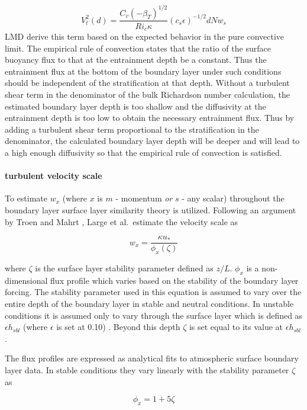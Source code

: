 \begin{equation}
  V_{t}^{2}(d)=\frac{C_v(-\beta_T)^{1/2}}{Ri_c
  \kappa}(c_s\epsilon)^{-1/2}dNw_s
\end{equation}
LMD derive this term based on the expected behavior in the pure
convective limit.  The empirical rule of convection states that the
ratio of the surface buoyancy flux to that at the entrainment depth be 
a constant.  Thus the entrainment flux at the
bottom of the boundary layer under such conditions should be
independent of the stratification at that depth.  Without a turbulent
shear term in the denominator of the bulk Richardson number
calculation, the estimated boundary layer depth is too shallow and the
diffusivity at the entrainment depth is too low to obtain the
necessary entrainment flux.  Thus by adding a turbulent shear term
proportional to the stratification in the denominator, the calculated
boundary layer depth will be deeper and will lead to a high enough
diffusivity so that the empirical rule of convection is satisfied.
  
\paragraph{turbulent velocity scale}
To estimate $w_x$ (where $x$ is $m$ - momentum {\em or} $s$
- any scalar) throughout the boundary layer surface layer similarity
theory is utilized.  Following an argument by Troen and Mahrt
\cite{TM86}, Large et al.\ estimate the velocity scale as

\begin{equation}
w_x=\frac{\kappa u_*}{\phi_x(\zeta)}
\end{equation}

where $\zeta$ is the surface layer stability parameter defined as
$z/L$.  $\phi_x$ is a non-dimensional flux profile which varies based
on the stability of the boundary layer forcing.  The stability
parameter used in this equation is assumed to vary over the entire
depth of the boundary layer in stable and neutral conditions.  In
unstable conditions it is assumed only to vary through the surface
layer which is defined as $ \epsilon h_{sbl} $ (where $\epsilon$ is
set at 0.10) .  Beyond this depth $\zeta$
is set equal to its value at $ \epsilon h_{sbl} $.

The flux profiles are expressed as analytical fits to atmospheric
surface boundary layer data.  In stable conditions they vary linearly
with the stability parameter $\zeta$  as

\begin{equation}
\phi_x=1+5\zeta
\end{equation}

